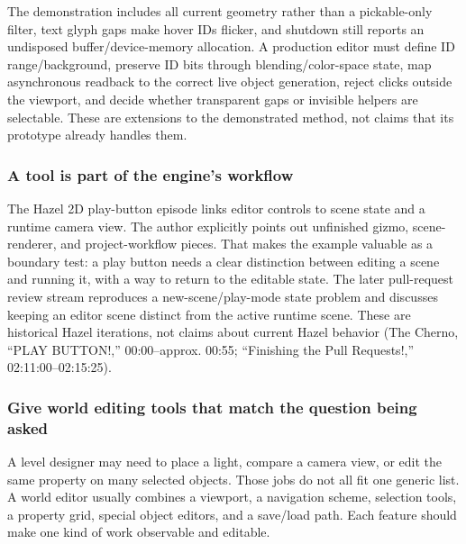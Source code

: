 The demonstration includes all current geometry rather than a pickable-only filter, text glyph gaps make hover IDs flicker, and shutdown still reports an undisposed buffer/device-memory allocation. A production editor must define ID range/background, preserve ID bits through blending/color-space state, map asynchronous readback to the correct live object generation, reject clicks outside the viewport, and decide whether transparent gaps or invisible helpers are selectable. These are extensions to the demonstrated method, not claims that its prototype already handles them.

\subsubsection{A tool is part of the engine's workflow}\label{06-engine-ii-ch032-a-tool-is-part-of-the-engines-workflow}

\hypertarget{06-engine-ii-ch032-a-tool-is-part-of-the-engines-workflow}{}

The Hazel 2D play-button episode links editor controls to scene state and a runtime camera view. The author explicitly points out unfinished gizmo, scene-renderer, and project-workflow pieces. That makes the example valuable as a boundary test: a play button needs a clear distinction between editing a scene and running it, with a way to return to the editable state. The later pull-request review stream reproduces a new-scene/play-mode state problem and discusses keeping an editor scene distinct from the active runtime scene. These are historical Hazel iterations, not claims about current Hazel behavior (The Cherno, ``PLAY BUTTON!,'' 00:00--approx. 00:55; ``Finishing the Pull Requests!,'' 02:11:00--02:15:25).

\subsubsection{Give world editing tools that match the question being asked}\label{06-engine-ii-ch032-give-world-editing-tools-that-match-the-question-being-asked}

\hypertarget{06-engine-ii-ch032-give-world-editing-tools-that-match-the-question-being-asked}{}

A level designer may need to place a light, compare a camera view, or edit the same property on many selected objects. Those jobs do not all fit one generic list. A world editor usually combines a viewport, a navigation scheme, selection tools, a property grid, special object editors, and a save/load path. Each feature should make one kind of work observable and editable.

